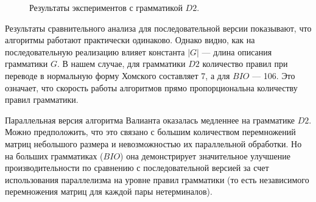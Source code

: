 \begin{figure}[h]
\centering
\begin{minipage}[b]{.5\linewidth}
    \label{fig:GSSedges}
	\end{minipage}
\begin{minipage}[b]{.45\linewidth}
\label{fig:Time}
\end{minipage}
\caption{Результаты экспериментов с грамматикой $D2$.}
\label{expPlots}
\end{figure}


Результаты сравнительного анализа для последовательной версии показывают, что алгоритмы работают практически одинаково. Однако видно, как на последовательную реализацию влияет константа $|G|$ --- длина описания грамматики $G$. В нашем случае, для грамматики $D2$ количество правил при переводе в нормальную форму Хомского составляет 7, а для $BIO$ ---  106. Это означает, что скорость работы алгоритмов прямо пропорциональна количеству правил грамматики.

Параллельная версия алгоритма Валианта оказалась медленнее на грамматике $D2$. Можно предположить, что это связано с большим количеством перемножений матриц небольшого размера и невозможностью их параллельной обработки. Но на больших грамматиках ($BIO$) она демонстрирует значительное улучшение производительности по сравнению с последовательной версией за счет использования параллелизма на уровне правил грамматики (то есть независимого перемножения матриц для каждой пары нетерминалов).

